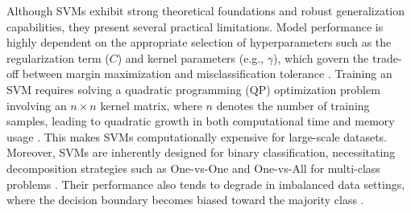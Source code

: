 Although SVMs exhibit strong theoretical foundations and robust generalization capabilities, they present several practical limitations. Model performance is highly dependent on the appropriate selection of hyperparameters such as the regularization term (\(C\)) and kernel parameters (e.g., \(\gamma\)), which govern the trade-off between margin maximization and misclassification tolerance \citep{nanda2018}. Training an SVM requires solving a quadratic programming (QP) optimization problem involving an \(n \times n\) kernel matrix, where \(n\) denotes the number of training samples, leading to quadratic growth in both computational time and memory usage \citep{dong2005}. This makes SVMs computationally expensive for large-scale datasets. Moreover, SVMs are inherently designed for binary classification, necessitating decomposition strategies such as One-vs-One and One-vs-All for multi-class problems \citep{hsu2002}. Their performance also tends to degrade in imbalanced data settings, where the decision boundary becomes biased toward the majority class \citep{cervantes2020}.



\address{%
Aneesh Agarwal\\
Monash University\\%
\\
%
%
%
\href{mailto:aaga0022@student.monash.edu}{\nolinkurl{aaga0022@student.monash.edu}}%
}

\address{%
Jack Jewson\\
Monash University\\%
Department of Econometrics and Business Statistics, Monash University, Australia\\
%
%
%
\href{mailto:Jack.Jewson@monash.edu}{\nolinkurl{Jack.Jewson@monash.edu}}%
}

\address{%
Erik Sverdrup\\
Monash University\\%
Department of Econometrics and Business Statistics, Monash University, Australia\\
%
%
%
\href{mailto:Erik.Sverdrup@monash.edu}{\nolinkurl{Erik.Sverdrup@monash.edu}}%
}
